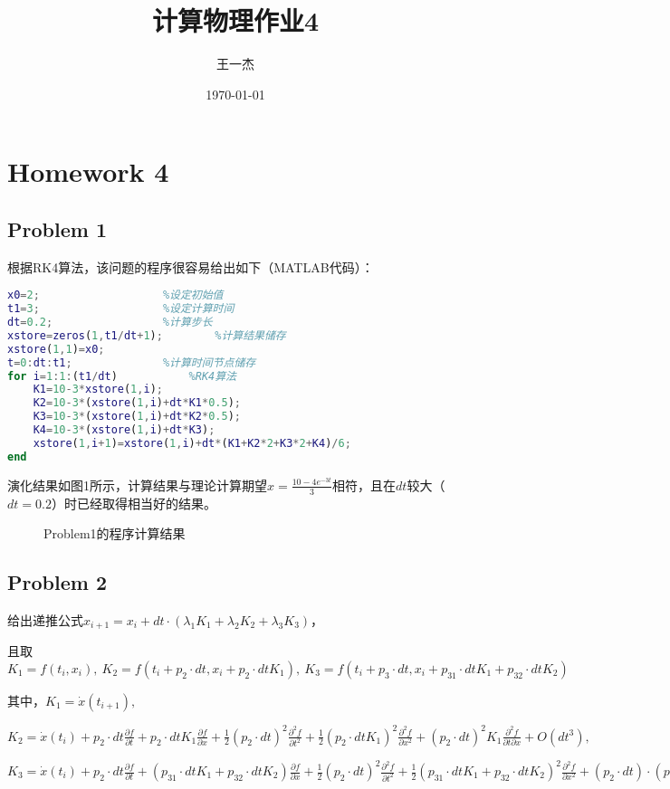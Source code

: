\documentclass{article}
\title{计算物理作业4} %
\author[a]{王一杰} %
\affil[a]{中国科学技术大学}
\date{\today}%
\begin{document}
\maketitle

\section{Homework 4}
\subsection{Problem 1}
根据RK4算法，该问题的程序很容易给出如下（MATLAB代码）：
\begin{lstlisting}[language=MATLAB]
x0=2;					%设定初始值
t1=3;					%设定计算时间
dt=0.2;					%计算步长
xstore=zeros(1,t1/dt+1);		%计算结果储存
xstore(1,1)=x0;			
t=0:dt:t1;				%计算时间节点储存
for i=1:1:(t1/dt)			%RK4算法
    K1=10-3*xstore(1,i);
    K2=10-3*(xstore(1,i)+dt*K1*0.5);
    K3=10-3*(xstore(1,i)+dt*K2*0.5);
    K4=10-3*(xstore(1,i)+dt*K3);
    xstore(1,i+1)=xstore(1,i)+dt*(K1+K2*2+K3*2+K4)/6;
end

\end{lstlisting}
演化结果如图1所示，计算结果与理论计算期望$x=\frac{10-4e^{-3t}}{3}$相符，且在$dt$较大（$dt=0.2$）时已经取得相当好的结果。
\begin{figure}[tbp]
 \caption{Problem1的程序计算结果}
\end{figure}

\subsection{Problem 2}
给出递推公式$x_{i+1}=x_i+dt\cdot(\lambda_1 K_1+\lambda_2 K_2+ \lambda_3 K_3)$，

且取$K_1=f(t_i,x_i),\ K_2=f(t_i+p_2\cdot dt,x_i+p_2\cdot dtK_1),\ K_3=f(t_i+p_3\cdot dt,x_i+p_{31}\cdot dtK_1+p_{32}\cdot dtK_2)$

其中，$K_1=\dot{x}(t_{i+1}),$

$K_2= \dot{x} ( t _ { i } ) +p_2\cdot dt\frac{\partial f}{\partial t}+p_2\cdot dtK_1\frac{\partial f}{\partial x}+\frac{1}{2}(p_2\cdot dt)^2\frac{\partial^2 f}{\partial t^2}+\frac{1}{2}(p_2\cdot dt K_1)^2\frac{\partial^2 f}{\partial x^2}+(p_2\cdot dt)^2K_1 \frac{\partial^2f}{\partial t \partial x}+O(dt^3),$

$K_3=\dot{x} ( t _ { i } ) +p_2\cdot dt\frac{\partial f}{\partial t}+(p_{31}\cdot dtK_1+p_{32}\cdot dtK_2)\frac{\partial f}{\partial x}+\frac{1}{2}(p_2\cdot dt)^2\frac{\partial^2 f}{\partial t^2}+\frac{1}{2}(p_{31}\cdot dtK_1+p_{32}\cdot dtK_2)^2\frac{\partial^2 f}{\partial x^2}+(p_2\cdot dt)\cdot(p_{31}\cdot dtK_1+p_{32}\cdot dtK_2) \frac{\partial^2f}{\partial t \partial x}+O(dt^3),$
\end{document}
